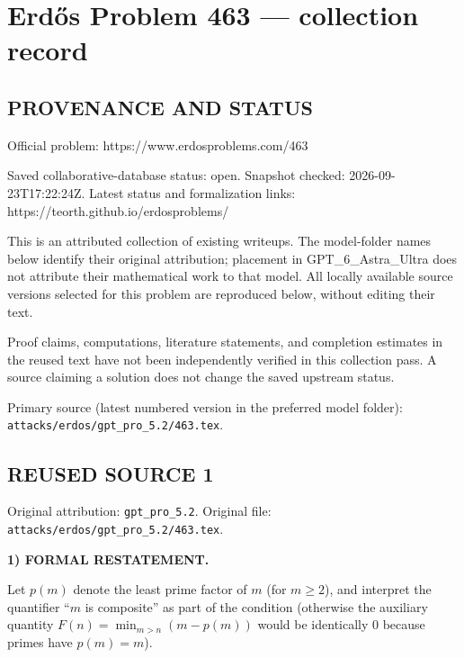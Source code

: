\section*{Erd\H{o}s Problem 463 --- collection record}

\subsection*{PROVENANCE AND STATUS}
Official problem: https://www.erdosproblems.com/463

Saved collaborative-database status: open.
Snapshot checked: 2026-09-23T17:22:24Z.
Latest status and formalization links: https://teorth.github.io/erdosproblems/

This is an attributed collection of existing writeups. The model-folder names below identify their original attribution; placement in GPT\_6\_Astra\_Ultra does not attribute their mathematical work to that model. All locally available source versions selected for this problem are reproduced below, without editing their text.

Proof claims, computations, literature statements, and completion estimates in the reused text have not been independently verified in this collection pass. A source claiming a solution does not change the saved upstream status.

Primary source (latest numbered version in the preferred model folder): \texttt{attacks/erdos/gpt\_pro\_5.2/463.tex}.

\subsection*{REUSED SOURCE 1}
Original attribution: \texttt{gpt\_pro\_5.2}.
Original file: \texttt{attacks/erdos/gpt\_pro\_5.2/463.tex}.


\noindent\textbf{1) FORMAL RESTATEMENT.}

Let $p(m)$ denote the least prime factor of $m$ (for $m\ge 2$), and interpret the quantifier ``$m$ is composite'' as part of the condition (otherwise the auxiliary quantity $F(n)=\min_{m>n}(m-p(m))$ would be identically $0$ because primes have $p(m)=m$).

